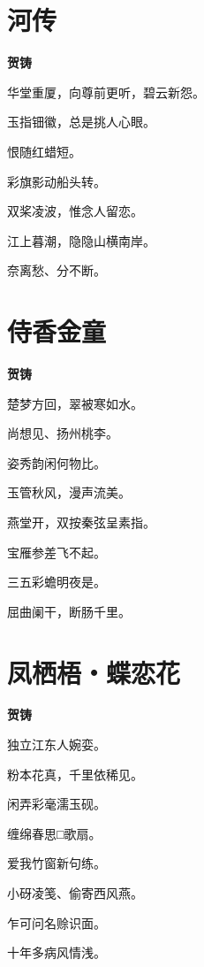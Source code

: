 \documentclass[12pt,a4paper]{ctexbook}
\begin{document}
\section{河传}
\textbf{贺铸}\par\vspace{0.5em}
华堂重厦，向尊前更听，碧云新怨。\par
玉指钿徽，总是挑人心眼。\par
恨随红蜡短。\par
彩旗影动船头转。\par
双桨凌波，惟念人留恋。\par
江上暮潮，隐隐山横南岸。\par
奈离愁、分不断。\par

\section{侍香金童}
\textbf{贺铸}\par\vspace{0.5em}
楚梦方回，翠被寒如水。\par
尚想见、扬州桃李。\par
姿秀韵闲何物比。\par
玉管秋风，漫声流美。\par
燕堂开，双按秦弦呈素指。\par
宝雁参差飞不起。\par
三五彩蟾明夜是。\par
屈曲阑干，断肠千里。\par

\section{凤栖梧・蝶恋花}
\textbf{贺铸}\par\vspace{0.5em}
独立江东人婉娈。\par
粉本花真，千里依稀见。\par
闲弄彩毫濡玉砚。\par
缠绵春思□歌扇。\par
爱我竹窗新句练。\par
小砑凌笺、偷寄西风燕。\par
乍可问名赊识面。\par
十年多病风情浅。\par
\end{document}

